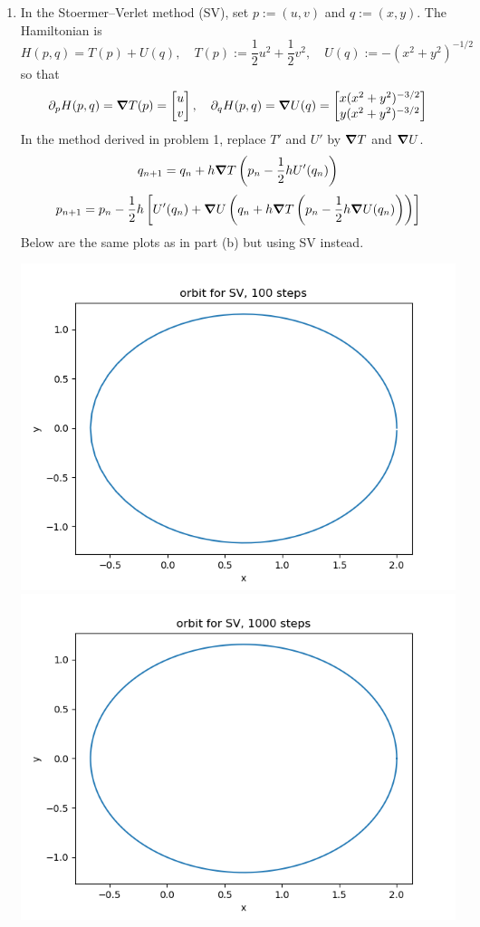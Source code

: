 \documentclass{article}
\newcommand{\br}[1]{\left(#1\right)}
\newcommand{\sbr}[1]{\left[#1\right]}
\newcommand{\m}[2][b]{\begin{#1matrix}#2\end{#1matrix}}
\newcommand{\ptl}{\partial}
\begin{document}
\begin{enumerate}[label=(\alph*)]
\item In the Stoermer--Verlet method (SV), set $p:=(u,v)$ and $q:=(x,y)$. The Hamiltonian is
$$H(p,q) = T(p) + U(q),
\quad T(p) := \frac12u^2 + \frac12v^2,
\quad U(q) := -(x^2 + y^2)^{-1/2}$$
so that
$$\ptl_pH(p,q) = \grad T(p) = \m{u \\ v},
\quad \ptl_qH(p,q) = \grad U(q) = \m{x(x^2+y^2)^{-3/2} \\ y(x^2+y^2)^{-3/2}}$$
In the method derived in problem 1, replace $T'$ and $U'$ by $\grad T$ and $\grad U$.
$$q_{n+1} = q_n + h\grad T\br{p_n - \frac12hU'(q_n)}$$
$$p_{n+1} = p_n - \frac12h\sbr{U'(q_n) + \grad U\br{q_n + h\grad T\br{p_n - \frac12h\grad U(q_n)}}}$$
Below are the same plots as in part (b) but using SV instead.

\begin{center}
	\includegraphics[scale=.3]{hw5 SV orbit 100 steps}
	\includegraphics[scale=.3]{hw5 SV orbit 1000 steps}

\end{center}
\end{enumerate}
\end{document}
